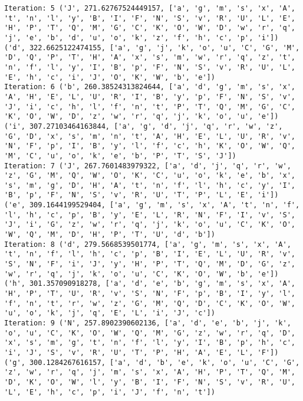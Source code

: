 \documentclass[english,man]{apa6}
\begin{document}
\begin{verbatim}
Iteration: 5 ('J', 271.62767524449157, ['a', 'g', 'm', 's', 'x', 'A', 't', 'n', 'l', 'y', 'B', 'I', 'F', 'N', 'S', 'v', 'R', 'U', 'L', 'E', 'H', 'P', 'T', 'Q', 'M', 'G', 'C', 'K', 'O', 'W', 'D', 'w', 'r', 'q', 'j', 'e', 'b', 'd', 'u', 'o', 'k', 'z', 'f', 'h', 'c', 'p', 'i']) ('d', 322.6625122474155, ['a', 'g', 'j', 'k', 'o', 'u', 'C', 'G', 'M', 'D', 'Q', 'P', 'T', 'H', 'A', 'x', 's', 'm', 'w', 'r', 'q', 'z', 't', 'n', 'f', 'l', 'y', 'I', 'B', 'p', 'F', 'N', 'S', 'v', 'R', 'U', 'L', 'E', 'h', 'c', 'i', 'J', 'O', 'K', 'W', 'b', 'e'])
Iteration: 6 ('b', 260.38524313824644, ['a', 'd', 'g', 'm', 's', 'x', 'A', 'H', 'E', 'L', 'U', 'R', 'I', 'B', 'y', 'p', 'F', 'N', 'S', 'v', 'J', 'i', 'c', 'h', 'l', 'f', 'n', 't', 'P', 'T', 'Q', 'M', 'G', 'C', 'K', 'O', 'W', 'D', 'z', 'w', 'r', 'q', 'j', 'k', 'o', 'u', 'e']) ('i', 307.27103464163844, ['a', 'g', 'd', 'j', 'q', 'r', 'w', 'z', 'G', 'D', 'x', 's', 'm', 'n', 't', 'A', 'H', 'E', 'L', 'U', 'R', 'v', 'N', 'F', 'p', 'I', 'B', 'y', 'l', 'f', 'c', 'h', 'K', 'O', 'W', 'Q', 'M', 'C', 'u', 'o', 'k', 'e', 'b', 'P', 'T', 'S', 'J'])
Iteration: 7 ('J', 267.7601483979322, ['a', 'd', 'j', 'q', 'r', 'w', 'z', 'G', 'M', 'Q', 'W', 'O', 'K', 'C', 'u', 'o', 'k', 'e', 'b', 'x', 's', 'm', 'g', 'D', 'H', 'A', 't', 'n', 'f', 'l', 'h', 'c', 'y', 'I', 'B', 'p', 'F', 'N', 'S', 'v', 'R', 'U', 'T', 'P', 'L', 'E', 'i']) ('e', 309.1644199529404, ['a', 'g', 'm', 's', 'x', 'A', 't', 'n', 'f', 'l', 'h', 'c', 'p', 'B', 'y', 'E', 'L', 'R', 'N', 'F', 'I', 'v', 'S', 'J', 'i', 'G', 'z', 'w', 'r', 'q', 'j', 'k', 'o', 'u', 'C', 'K', 'O', 'W', 'Q', 'M', 'D', 'H', 'P', 'T', 'U', 'd', 'b'])
Iteration: 8 ('d', 279.5668539501774, ['a', 'g', 'm', 's', 'x', 'A', 't', 'n', 'f', 'l', 'h', 'c', 'p', 'B', 'I', 'E', 'L', 'U', 'R', 'v', 'S', 'N', 'F', 'i', 'J', 'y', 'H', 'P', 'T', 'Q', 'M', 'D', 'G', 'z', 'w', 'r', 'q', 'j', 'k', 'o', 'u', 'C', 'K', 'O', 'W', 'b', 'e']) ('h', 301.357090918278, ['a', 'd', 'e', 'b', 'g', 'm', 's', 'x', 'A', 'H', 'P', 'T', 'U', 'R', 'v', 'S', 'N', 'F', 'p', 'B', 'I', 'y', 'l', 'f', 'n', 't', 'r', 'w', 'z', 'G', 'M', 'Q', 'D', 'C', 'K', 'O', 'W', 'u', 'o', 'k', 'j', 'q', 'E', 'L', 'i', 'J', 'c'])
Iteration: 9 ('N', 257.8902390602136, ['a', 'd', 'e', 'b', 'j', 'k', 'o', 'u', 'C', 'K', 'O', 'W', 'Q', 'M', 'G', 'z', 'w', 'r', 'q', 'D', 'x', 's', 'm', 'g', 't', 'n', 'f', 'l', 'y', 'I', 'B', 'p', 'h', 'c', 'i', 'J', 'S', 'v', 'R', 'U', 'T', 'P', 'H', 'A', 'E', 'L', 'F']) ('g', 300.1284267616157, ['a', 'd', 'b', 'e', 'k', 'o', 'u', 'C', 'G', 'z', 'w', 'r', 'q', 'j', 'm', 's', 'x', 'A', 'H', 'P', 'T', 'Q', 'M', 'D', 'K', 'O', 'W', 'l', 'y', 'B', 'I', 'F', 'N', 'S', 'v', 'R', 'U', 'L', 'E', 'h', 'c', 'p', 'i', 'J', 'f', 'n', 't'])

\end{verbatim}
\end{document}
